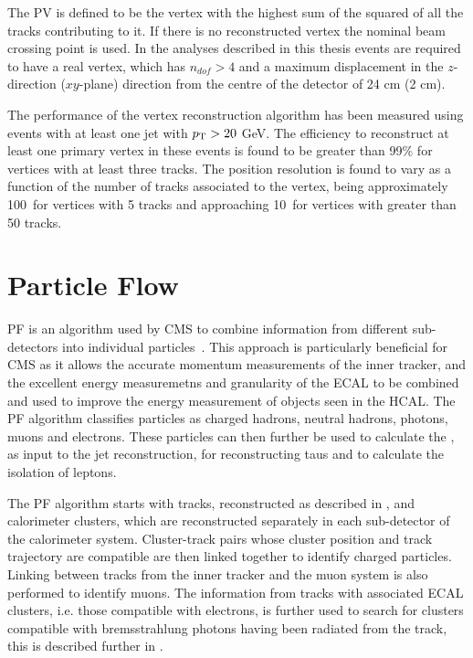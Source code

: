 The \ac{PV} is defined to be the vertex with the highest sum of the squared \pt of all the tracks contributing to it. If there is no reconstructed vertex the nominal beam crossing point is used. In the analyses described in this thesis events are required to have a real vertex, which has $n_{dof}>4$ and a maximum displacement in the $z$-direction ($xy$-plane) direction from the centre of the detector of 24 cm (2 cm).

The performance of the vertex reconstruction algorithm has been measured using events with at least one jet with $p_{\mathrm{T}}>20$ GeV. The efficiency to reconstruct at least one primary vertex in these events is found to be greater than 99\% for vertices with at least three tracks. The position resolution is found to vary as a function of the number of tracks associated to the vertex, being approximately 100\micron\, for vertices with 5 tracks and approaching 10\micron\, for vertices with greater than 50 tracks.

\section{Particle Flow}
\label{sec:pf}
\ac{PF} is an algorithm used by CMS to combine information from different sub-detectors into individual particles~\cite{CMS-PAS-PFT-09-001,CMS-PAS-PFT-10-001,CMS-PAS-PFT-10-002}. This approach is particularly beneficial for CMS as it allows the accurate momentum measurements of the inner tracker, and the excellent energy measuremetns and granularity of the \ac{ECAL} to be combined and used to improve the energy measurement of objects seen in the \ac{HCAL}. The \ac{PF} algorithm classifies particles as charged hadrons, neutral hadrons, photons, muons and electrons. These particles can then further be used to calculate the \MET, as input to the jet reconstruction, for reconstructing taus and to calculate the isolation of leptons.

The \ac{PF} algorithm starts with tracks, reconstructed as described in , and calorimeter clusters, which are reconstructed separately in each sub-detector of the calorimeter system. Cluster-track pairs whose cluster position and track trajectory are compatible are then linked together to identify charged particles. Linking between tracks from the inner tracker and the muon system is also performed to identify muons. The information from tracks with associated \ac{ECAL} clusters, i.e. those compatible with electrons, is further used to search for clusters compatible with bremsstrahlung photons having been radiated from the track, this is described further in .

